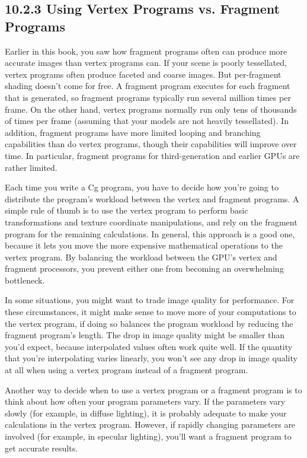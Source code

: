 \documentclass[../main.tex]{subfiles}
\begin{document}
\subsection{10.2.3 Using Vertex Programs vs. Fragment Programs}

Earlier in this book, you saw how fragment programs often can produce more accurate images than vertex programs can. If your scene is poorly tessellated, vertex programs often produce faceted and coarse images. But per-fragment shading doesn't come for free. A fragment program executes for each fragment that is generated, so fragment programs typically run several million times per frame. On the other hand, vertex programs normally run only tens of thousands of times per frame (assuming that your models are not heavily tessellated). In addition, fragment programs have more limited looping and branching capabilities than do vertex programs, though their capabilities will improve over time. In particular, fragment programs for third-generation and earlier GPUs are rather limited.

Each time you write a Cg program, you have to decide how you're going to distribute the program's workload between the vertex and fragment programs. A simple rule of thumb is to use the vertex program to perform basic transformations and texture coordinate manipulations, and rely on the fragment program for the remaining calculations. In general, this approach is a good one, because it lets you move the more expensive mathematical operations to the vertex program. By balancing the workload between the GPU's vertex and fragment processors, you prevent either one from becoming an overwhelming bottleneck.

In some situations, you might want to trade image quality for performance. For these circumstances, it might make sense to move more of your computations to the vertex program, if doing so balances the program workload by reducing the fragment program's length. The drop in image quality might be smaller than you'd expect, because interpolated values often work quite well. If the quantity that you're interpolating varies linearly, you won't see any drop in image quality at all when using a vertex program instead of a fragment program.

Another way to decide when to use a vertex program or a fragment program is to think about how often your program parameters vary. If the parameters vary slowly (for example, in diffuse lighting), it is probably adequate to make your calculations in the vertex program. However, if rapidly changing parameters are involved (for example, in specular lighting), you'll want a fragment program to get accurate results.
\end{document}

